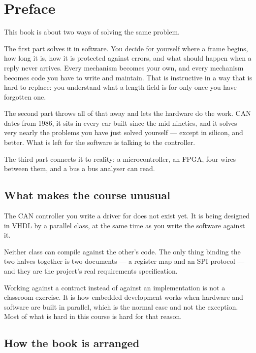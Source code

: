 \chapter*{Preface}

This book is about two ways of solving the same problem.

The first part solves it in software. You decide for yourself where a frame begins, how long it
is, how it is protected against errors, and what should happen when a reply never arrives. Every
mechanism becomes your own, and every mechanism becomes code you have to write and maintain. That
is instructive in a way that is hard to replace: you understand what a length field is for only
once you have forgotten one.

The second part throws all of that away and lets the hardware do the work. CAN dates from 1986,
it sits in every car built since the mid-nineties, and it solves very nearly the problems you have
just solved yourself --- except in silicon, and better. What is left for the software is talking
to the controller.

The third part connects it to reality: a microcontroller, an FPGA, four wires between them, and a
bus a bus analyser can read.

\section*{What makes the course unusual}

The CAN controller you write a driver for does not exist yet. It is being designed in VHDL by a
parallel class, at the same time as you write the software against it.

Neither class can compile against the other's code. The only thing binding the two halves
together is two documents --- a register map and an SPI protocol --- and they are the project's
real requirements specification.

\begin{aside}
\note Working against a contract instead of against an implementation is not a classroom
exercise. It is how embedded development works when hardware and software are built in parallel,
which is the normal case and not the exception. Most of what is hard in this course is hard for
that reason.
\end{aside}

\section*{How the book is arranged}

